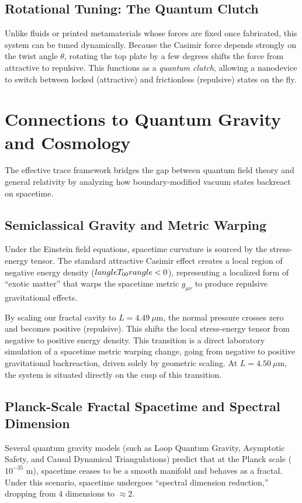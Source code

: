 \documentclass[12pt,letterpaper]{article}
\begin{document}
\subsection{Rotational Tuning: The Quantum Clutch}
Unlike fluids or printed metamaterials whose forces are fixed once fabricated, this system can be tuned dynamically. Because the Casimir force depends strongly on the twist angle $\theta$, rotating the top plate by a few degrees shifts the force from attractive to repulsive. This functions as a \emph{quantum clutch}, allowing a nanodevice to switch between locked (attractive) and frictionless (repulsive) states on the fly.


\section{Connections to Quantum Gravity and Cosmology}
\label{sec:quantum_gravity}

The effective trace framework bridges the gap between quantum field theory and general relativity by analyzing how boundary-modified vacuum states backreact on spacetime.

\subsection{Semiclassical Gravity and Metric Warping}
Under the Einstein field equations, spacetime curvature is sourced by the stress-energy tensor. The standard attractive Casimir effect creates a local region of negative energy density ($\\langle T_{00} \\rangle < 0$), representing a localized form of ``exotic matter'' that warps the spacetime metric $g_{\mu\nu}$ to produce repulsive gravitational effects. 

By scaling our fractal cavity to $L = 4.49\ \mu\text{m}$, the normal pressure crosses zero and becomes positive (repulsive). This shifts the local stress-energy tensor from negative to positive energy density. This transition is a direct laboratory simulation of a spacetime metric warping change, going from negative to positive gravitational backreaction, driven solely by geometric scaling. At $L = 4.50\ \mu\text{m}$, the system is situated directly on the cusp of this transition.

\subsection{Planck-Scale Fractal Spacetime and Spectral Dimension}
Several quantum gravity models (such as Loop Quantum Gravity, Asymptotic Safety, and Causal Dynamical Triangulations) predict that at the Planck scale ($10^{-35}$ m), spacetime ceases to be a smooth manifold and behaves as a fractal. Under this scenario, spacetime undergoes ``spectral dimension reduction,'' dropping from $4$ dimensions to $\approx 2$.
\end{document}
